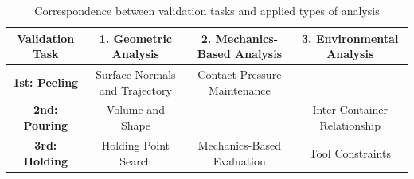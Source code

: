 \begin{table}[htbp]
  \centering
  \caption{Correspondence between validation tasks and applied types of analysis}
  \label{tab:tasks}
  
  \scriptsize
  \setlength{\tabcolsep}{4pt}
  \renewcommand{\arraystretch}{0.95}
  \begin{tabularx}{.95\textwidth}{@{}cccc@{}}
    \toprule
    Validation Task & 1. Geometric Analysis & 2. Mechanics-Based Analysis & 3. Environmental Analysis \\
    \midrule
    \textbf{1st: Peeling} & Surface Normals and Trajectory & Contact Pressure Maintenance & ------ \\
    \addlinespace
    \textbf{2nd: Pouring} & Volume and Shape & ------ & Inter-Container Relationship \\
    \addlinespace
    \textbf{3rd: Holding} & Holding Point Search & Mechanics-Based Evaluation & Tool Constraints \\
    \bottomrule
  \end{tabularx}
\end{table}

